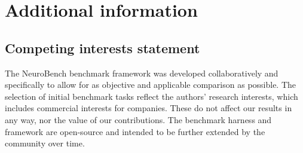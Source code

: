
\section*{Additional information}

\subsection*{Competing interests statement}

The NeuroBench benchmark framework was developed collaboratively and specifically to allow for as objective and applicable comparison as possible. The selection of initial benchmark tasks reflect the authors' research interests, which includes commercial interests for companies. These do not affect our results in any way, nor the value of our contributions. The benchmark harness and framework are open-source and intended to be further extended by the community over time.

